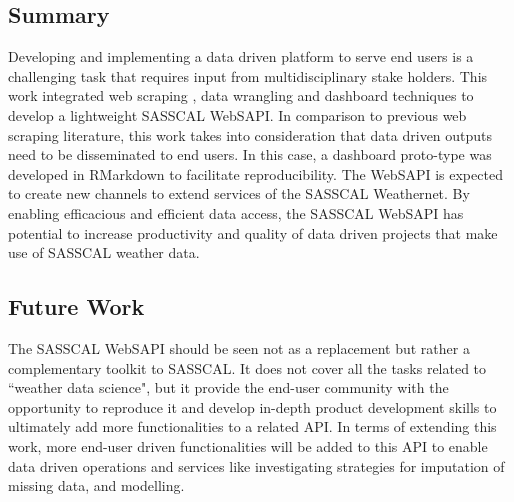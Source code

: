 \documentclass[a4paper, 10pt, conference]{ieeeconf}      %
\begin{document}
\subsection{Summary}
\noindent
Developing and implementing a data driven platform to serve end users is a challenging task that requires input from multidisciplinary stake holders. This work integrated web scraping \cite{WebSrapping}, data wrangling and dashboard techniques   to develop a lightweight SASSCAL WebSAPI.
In  comparison  to  previous web scraping literature,  this work   takes  into consideration that data driven outputs need to be disseminated to end users. In this case, a dashboard proto-type was developed in RMarkdown to facilitate reproducibility. The WebSAPI is expected to create new channels to extend services of the SASSCAL Weathernet.
By enabling efficacious and efficient data access, the SASSCAL WebSAPI has potential to increase   productivity and quality of data driven  projects that make use of  SASSCAL weather data.

\subsection{\textbf{Future Work}}
\noindent
The  SASSCAL WebSAPI  should be seen  not as a replacement but rather  a  complementary
toolkit to   SASSCAL. It does not cover all the tasks related to ``weather data science", but it provide the end-user community with the opportunity to reproduce it and  develop in-depth product development skills to ultimately add more functionalities to a related API. 
In terms of extending this work, more end-user driven functionalities will be added to this API to enable  data driven operations and services like investigating strategies for imputation of missing  data, and  modelling. %
\end{document}
